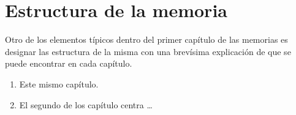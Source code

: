 \section{Estructura de la memoria}
Otro de los elementos típicos dentro del primer capítulo de las memorias es designar las estructura de la misma con una brevísima  explicación de que se puede encontrar en cada capítulo.

\begin{enumerate}[label={Capítulo \arabic*},leftmargin=2.5cm]
\item Este mismo capítulo.
\item El segundo de los capítulo centra \ldots
\end{enumerate}

